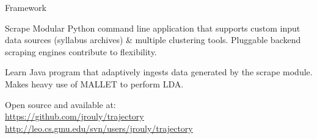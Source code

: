 \documentclass{beamer}
\begin{document}
  \begin{frame}{Framework}

    \begin{block}{Scrape}
      Modular Python command line application that supports custom input
      data sources (syllabus archives) \& multiple clustering tools.
      Pluggable backend scraping engines contribute to flexibility.
    \end{block}

    \vfill

    \begin{block}{Learn}
      Java program that adaptively ingests data generated by the scrape
      module. Makes heavy use of MALLET to perform LDA.
    \end{block}

    \vfill

    Open source and available at:\\
    \url{https://github.com/jrouly/trajectory}\\
    \url{http://leo.cs.gmu.edu/svn/users/jrouly/trajectory}

  \end{frame}
\end{document}
